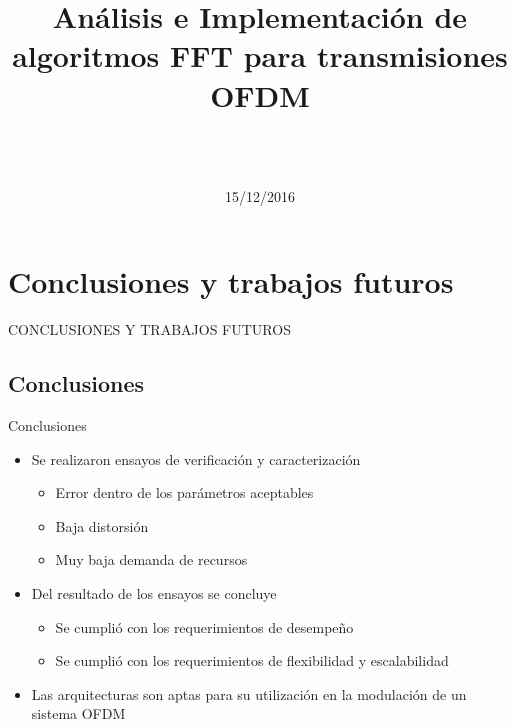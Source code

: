 \documentclass{bredelebeamer}
\title[Tesis de Grado de Ingeniería Electrónica]{Análisis e Implementación de algoritmos FFT para
transmisiones OFDM}
\author[Andres Dario Cassagnes]{\fontsize{11}{60}\selectfont{\textit{Alumno:} Sr. Andrés Dario
Cassagnes}\\
\fontsize{8}{12}\selectfont{\textit{Director:} Dr. Ing. Ariel Lutenberg}\\
\fontsize{8}{12}\selectfont{\textit{Codirector:} Ing. Federico Giordano Zacchigna}}
\institute[LSE-FIUBA]{\fontsize{7}{10}\selectfont{Laboratorio de Sistemas Embebidos}\\
\fontsize{6}{10}\selectfont{Facultad de Ingeniría\\ Universidad de Buenos Aires}}
\date{15/12/2016}
\newcommand\Fontit{\fontsize{9}{15}\selectfont}
\newcommand\Fontitit{\fontsize{8}{13}\selectfont}
\begin{document}
\begin{frame}
  \titlepage
\end{frame}







\section{Conclusiones y trabajos futuros}

\begin{frame}
\begin{center}
\Huge CONCLUSIONES Y TRABAJOS FUTUROS
\end{center}
\end{frame}

\subsection{Conclusiones}
\begin{frame}{Conclusiones}
\Fontit
\begin{itemize}
  \item<1-> Se realizaron ensayos de verificación y caracterización
  \begin{itemize}
    \Fontitit
    \item<2-> Error dentro de los parámetros aceptables
    \item<3-> Baja distorsión
    \item<4-> Muy baja demanda de recursos
  \end{itemize} 
  \item<5-> Del resultado de los ensayos se concluye 
  \begin{itemize}
    \Fontitit
    \item<6-> Se cumplió con los requerimientos de desempeño
    \item<7-> Se cumplió con los requerimientos de flexibilidad y escalabilidad
  \end{itemize}
  \item<8-> Las arquitecturas son aptas para su utilización en la modulación de un sistema OFDM       
\end{itemize}

\end{frame}
\end{document}

